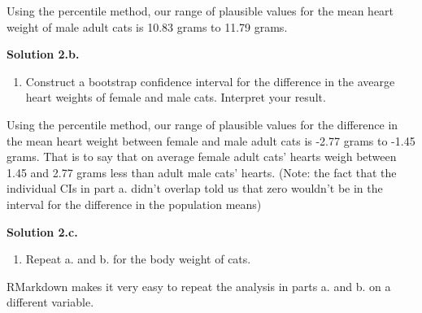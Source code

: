 \documentclass[]{article}
\newenvironment{Shaded}{\begin{snugshade}}{\end{snugshade}}
\newcommand{\KeywordTok}[1]{\textcolor[rgb]{0.13,0.29,0.53}{\textbf{#1}}}
\newcommand{\DataTypeTok}[1]{\textcolor[rgb]{0.13,0.29,0.53}{#1}}
\newcommand{\DecValTok}[1]{\textcolor[rgb]{0.00,0.00,0.81}{#1}}
\newcommand{\StringTok}[1]{\textcolor[rgb]{0.31,0.60,0.02}{#1}}
\newcommand{\OperatorTok}[1]{\textcolor[rgb]{0.81,0.36,0.00}{\textbf{#1}}}
\newcommand{\NormalTok}[1]{#1}
\providecommand{\tightlist}{%
  \setlength{\itemsep}{0pt}\setlength{\parskip}{0pt}}
\begin{document}
Using the percentile method, our range of plausible values for the mean
heart weight of male adult cats is 10.83 grams to 11.79 grams.

\textbf{Solution 2.b.}

\begin{enumerate}
\def\labelenumi{\alph{enumi}.}
\setcounter{enumi}{1}
\tightlist
\item
  Construct a bootstrap confidence interval for the difference in the
  avearge heart weights of female and male cats. Interpret your result.
\end{enumerate}

\begin{Shaded}
\end{Shaded}

Using the percentile method, our range of plausible values for the
difference in the mean heart weight between female and male adult cats
is -2.77 grams to -1.45 grams. That is to say that on average female
adult cats' hearts weigh between 1.45 and 2.77 grams less than adult
male cats' hearts. (Note: the fact that the individual CIs in part a.
didn't overlap told us that zero wouldn't be in the interval for the
difference in the population means)

\textbf{Solution 2.c.}

\begin{enumerate}
\def\labelenumi{\alph{enumi}.}
\setcounter{enumi}{2}
\tightlist
\item
  Repeat a. and b. for the body weight of cats.
\end{enumerate}

RMarkdown makes it very easy to repeat the analysis in parts a. and b.
on a different variable.
\end{document}
